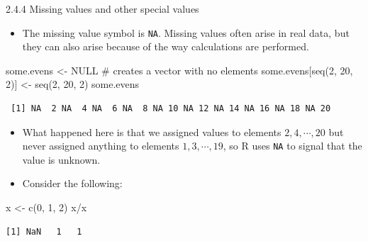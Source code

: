 \documentclass[
  9pt,
  a4paper,
  ignorenonframetext,
  notheorems]{beamer}
\newenvironment{Shaded}{\begin{snugshade}}{\end{snugshade}}
\newcommand{\CommentTok}[1]{\textcolor[rgb]{0.37,0.37,0.37}{#1}}
\newcommand{\ConstantTok}[1]{\textcolor[rgb]{0.56,0.35,0.01}{#1}}
\newcommand{\DecValTok}[1]{\textcolor[rgb]{0.68,0.00,0.00}{#1}}
\newcommand{\FunctionTok}[1]{\textcolor[rgb]{0.28,0.35,0.67}{#1}}
\newcommand{\NormalTok}[1]{\textcolor[rgb]{0.00,0.23,0.31}{#1}}
\newcommand{\OtherTok}[1]{\textcolor[rgb]{0.00,0.23,0.31}{#1}}
\newcommand{\SpecialCharTok}[1]{\textcolor[rgb]{0.37,0.37,0.37}{#1}}
\providecommand{\tightlist}{%
  \setlength{\itemsep}{0pt}\setlength{\parskip}{0pt}}\usepackage{longtable,booktabs,array}
\begin{document}
\begin{frame}[fragile]{2.4.4 Missing values and other special values}
\protect\hypertarget{missing-values-and-other-special-values}{}
\begin{itemize}
\tightlist
\item
  The missing value symbol is \texttt{NA}. Missing values often arise in
  real data, but they can also arise because of the way calculations are
  performed.
\end{itemize}

\begin{Shaded}
\begin{Highlighting}[]
\NormalTok{some.evens }\OtherTok{\textless{}{-}} \ConstantTok{NULL} \CommentTok{\# creates a vector with no elements }
\NormalTok{some.evens[}\FunctionTok{seq}\NormalTok{(}\DecValTok{2}\NormalTok{, }\DecValTok{20}\NormalTok{, }\DecValTok{2}\NormalTok{)] }\OtherTok{\textless{}{-}} \FunctionTok{seq}\NormalTok{(}\DecValTok{2}\NormalTok{, }\DecValTok{20}\NormalTok{, }\DecValTok{2}\NormalTok{)}
\NormalTok{some.evens}
\end{Highlighting}
\end{Shaded}

\begin{verbatim}
 [1] NA  2 NA  4 NA  6 NA  8 NA 10 NA 12 NA 14 NA 16 NA 18 NA 20
\end{verbatim}

\begin{itemize}
\item
  What happened here is that we assigned values to elements
  \(2,4, \cdots ,20\) but never assigned anything to elements
  \(1, 3, \cdots , 19\), so R uses \texttt{NA} to signal that the value
  is unknown.
\item
  Consider the following:
\end{itemize}

\begin{Shaded}
\begin{Highlighting}[]
\NormalTok{x }\OtherTok{\textless{}{-}} \FunctionTok{c}\NormalTok{(}\DecValTok{0}\NormalTok{, }\DecValTok{1}\NormalTok{, }\DecValTok{2}\NormalTok{)}
\NormalTok{x}\SpecialCharTok{/}\NormalTok{x}
\end{Highlighting}
\end{Shaded}

\begin{verbatim}
[1] NaN   1   1
\end{verbatim}
\end{frame}
\end{document}
